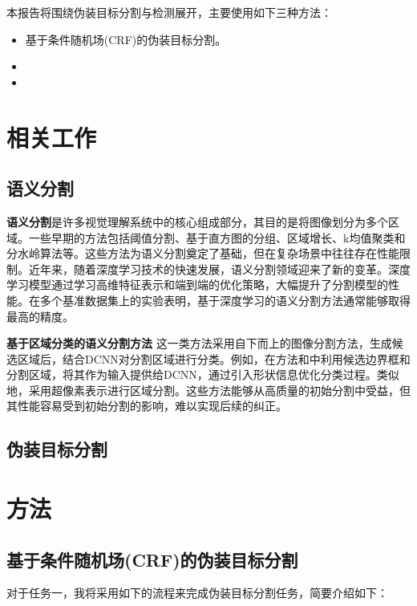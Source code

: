 \documentclass[a4paper,12pt]{ctexart}
\begin{document}
本报告将围绕伪装目标分割与检测展开，主要使用如下三种方法：
\begin{itemize}
    \item 基于条件随机场(CRF)的伪装目标分割。
    \item 
    \item 
\end{itemize}

\section{相关工作}

\subsection{语义分割}
\textbf{语义分割}是许多视觉理解系统中的核心组成部分，其目的是将图像划分为多个区域。一些早期的方法包括阈值分割\cite{Otsu1979ATS}、基于直方图的分组、区域增长\cite{Nock2004StatisticalRM}、k均值聚类\cite{Dhanachandra2015ImageSU}和分水岭算法\cite{Najman1994WatershedOA}等。这些方法为语义分割奠定了基础，但在复杂场景中往往存在性能限制。近年来，随着深度学习技术的快速发展，语义分割领域迎来了新的变革。深度学习模型通过学习高维特征表示和端到端的优化策略，大幅提升了分割模型的性能。在多个基准数据集上的实验表明，基于深度学习的语义分割方法通常能够取得最高的精度。

\textbf{基于区域分类的语义分割方法} 这一类方法采用自下而上的图像分割方法，生成候选区域后，结合DCNN对分割区域进行分类。例如，在方法\cite{Arbelez2014MultiscaleCG}和\cite{Uijlings2013SelectiveSF}中利用候选边界框和分割区域，将其作为输入提供给DCNN，通过引入形状信息优化分类过程。类似地，\cite{Mostajabi2014FeedforwardSS}采用超像素表示进行区域分割。这些方法能够从高质量的初始分割中受益，但其性能容易受到初始分割的影响，难以实现后续的纠正。

\subsection{伪装目标分割}
\section{方法}

\subsection{基于条件随机场(CRF)的伪装目标分割}

对于任务一，我将采用如下的流程来完成伪装目标分割任务，简要介绍如下：
\end{document}
